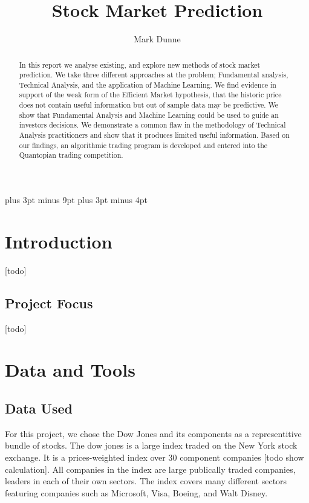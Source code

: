 \documentclass{report}
\title{Stock Market Prediction}
\author{Mark Dunne}
\begin{document}
\linespread{1.3}
\belowdisplayskip=12pt plus 3pt minus 9pt
\belowdisplayshortskip=7pt plus 3pt minus 4pt

\maketitle

\begin{abstract}

In this report we analyse existing, and explore new methods of stock market prediction. We take three different approaches at the problem; Fundamental analysis, Technical Analysis, and the application of Machine Learning. We find evidence in support of the weak form of the Efficient Market hypothesis, that the historic price does not contain useful information but out of sample data may be predictive. We show that Fundamental Analysis and Machine Learning could be used to guide an investors decisions. We demonstrate a common flaw in the methodology of Technical Analysis practitioners and show that it produces limited useful information. Based on our findings, an algorithmic trading program is developed and entered into the Quantopian trading competition.

\end{abstract}

\tableofcontents

\chapter{Introduction}

[todo]

\section{Project Focus}

[todo]

\chapter{Data and Tools}

\section{Data Used}

For this project, we chose the Dow Jones and its components as a representitive bundle of stocks. The dow jones is a large index traded on the New York stock exchange. It is a prices-weighted index over 30 component companies [todo show calculation]. All companies in the index are large publically traded companies, leaders in each of their own sectors. The index covers many different sectors featuring companies such as Microsoft, Visa, Boeing, and Walt Disney.
\end{document}

